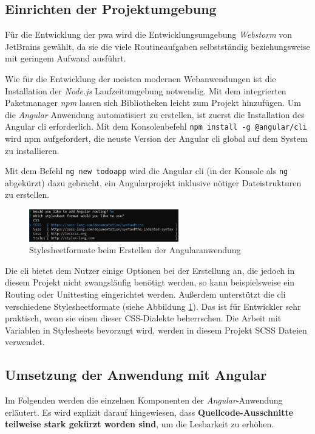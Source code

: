 \subsection{Einrichten der Projektumgebung}
Für die Entwicklung der \ac{pwa} wird die Entwicklungsumgebung \textit{Webstorm} von JetBrains gewählt, da sie die viele Routineaufgaben selbstständig beziehungsweise mit geringem Aufwand ausführt.

Wie für die Entwicklung der meisten modernen Webanwendungen ist die Installation der \textit{Node.js} Laufzeitumgebung notwendig. Mit dem integrierten Paketmanager \textit{npm} lassen sich Bibliotheken leicht zum Projekt hinzufügen.
Um die \textit{Angular} Anwendung automatisiert zu erstellen, ist zuerst die Installation des Angular \acf{cli} erforderlich. Mit dem Konsolenbefehl \texttt{npm install -g @angular/cli} wird npm aufgefordert, die neuste Version der Angular \ac{cli} global auf dem System zu installieren.


Mit dem Befehl \texttt{ng new todoapp} wird die Angular \ac{cli} (in der Konsole als \texttt{ng} abgekürzt) dazu gebracht, ein Angularprojekt inklusive nötiger Dateistrukturen zu erstellen.

\begin{figure}[h!]
	\centering
	\includegraphics[width=0.58\textwidth]{img/angular_cli_css.PNG}
	\caption{Stylesheetformate beim Erstellen der Angularanwendung}
	\label{fig:stylesheet_formate_cli}
\end{figure}

Die \ac{cli} bietet dem Nutzer einige Optionen bei der Erstellung an, die jedoch in diesem Projekt nicht zwangsläufig benötigt werden, so kann beispielsweise ein Routing oder Unittesting eingerichtet werden.
Außerdem unterstützt die \ac{cli} verschiedene Stylesheetformate (siehe Abbildung \ref{fig:stylesheet_formate_cli}). Das ist für Entwickler sehr praktisch, wenn sie einen dieser CSS-Dialekte beherrschen. Die Arbeit mit Variablen in Stylesheets bevorzugt wird, werden in diesem Projekt SCSS Dateien verwendet.


\subsection{Umsetzung der Anwendung mit Angular}

Im Folgenden werden die einzelnen Komponenten der \textit{Angular}-Anwendung erläutert. Es wird explizit darauf hingewiesen, dass \textbf{Quellcode-Ausschnitte teilweise stark gekürzt worden sind}, um die Lesbarkeit zu erhöhen.

